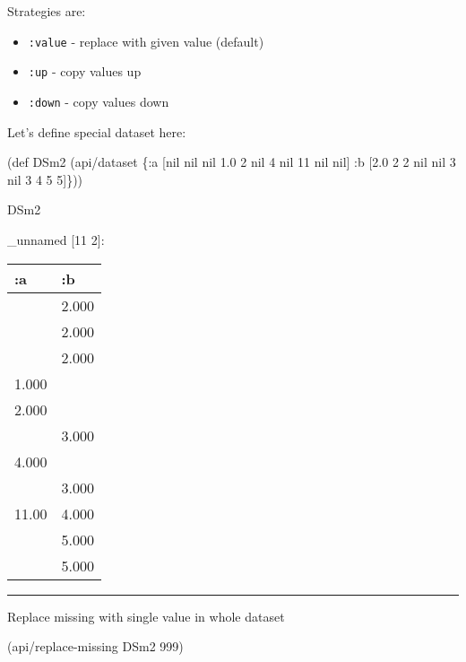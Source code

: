 \documentclass[]{article}
\newenvironment{Shaded}{\begin{snugshade}}{\end{snugshade}}
\newcommand{\DecValTok}[1]{\textcolor[rgb]{0.00,0.00,0.81}{#1}}
\newcommand{\FloatTok}[1]{\textcolor[rgb]{0.00,0.00,0.81}{#1}}
\newcommand{\FunctionTok}[1]{\textcolor[rgb]{0.00,0.00,0.00}{#1}}
\newcommand{\VariableTok}[1]{\textcolor[rgb]{0.00,0.00,0.00}{#1}}
\newcommand{\BuiltInTok}[1]{#1}
\newcommand{\AttributeTok}[1]{\textcolor[rgb]{0.77,0.63,0.00}{#1}}
\newcommand{\NormalTok}[1]{#1}
\providecommand{\tightlist}{%
  \setlength{\itemsep}{0pt}\setlength{\parskip}{0pt}}
\begin{document}
Strategies are:

\begin{itemize}
\tightlist
\item
  \texttt{:value} - replace with given value (default)
\item
  \texttt{:up} - copy values up
\item
  \texttt{:down} - copy values down
\end{itemize}

Let's define special dataset here:

\begin{Shaded}
\begin{Highlighting}[]
\NormalTok{(}\BuiltInTok{def}\FunctionTok{ DSm2 }\NormalTok{(api/dataset \{}\AttributeTok{:a}\NormalTok{ [}\VariableTok{nil} \VariableTok{nil} \VariableTok{nil} \FloatTok{1.0} \DecValTok{2}   \VariableTok{nil} \DecValTok{4}   \VariableTok{nil}  \DecValTok{11} \VariableTok{nil} \VariableTok{nil}\NormalTok{]}
                        \AttributeTok{:b}\NormalTok{ [}\FloatTok{2.0}   \DecValTok{2}   \DecValTok{2} \VariableTok{nil} \VariableTok{nil} \DecValTok{3}   \VariableTok{nil}   \DecValTok{3}  \DecValTok{4}  \DecValTok{5} \DecValTok{5}\NormalTok{]\}))}
\end{Highlighting}
\end{Shaded}

\begin{Shaded}
\begin{Highlighting}[]
\NormalTok{DSm2}
\end{Highlighting}
\end{Shaded}

\_unnamed {[}11 2{]}:

\begin{longtable}[]{@{}ll@{}}
\toprule
:a & :b\tabularnewline
\midrule
\endhead
& 2.000\tabularnewline
& 2.000\tabularnewline
& 2.000\tabularnewline
1.000 &\tabularnewline
2.000 &\tabularnewline
& 3.000\tabularnewline
4.000 &\tabularnewline
& 3.000\tabularnewline
11.00 & 4.000\tabularnewline
& 5.000\tabularnewline
& 5.000\tabularnewline
\bottomrule
\end{longtable}

\begin{center}\rule{0.5\linewidth}{0.5pt}\end{center}

Replace missing with single value in whole dataset

\begin{Shaded}
\begin{Highlighting}[]
\NormalTok{(api/replace-missing DSm2 }\DecValTok{999}\NormalTok{)}
\end{Highlighting}
\end{Shaded}
\end{document}
